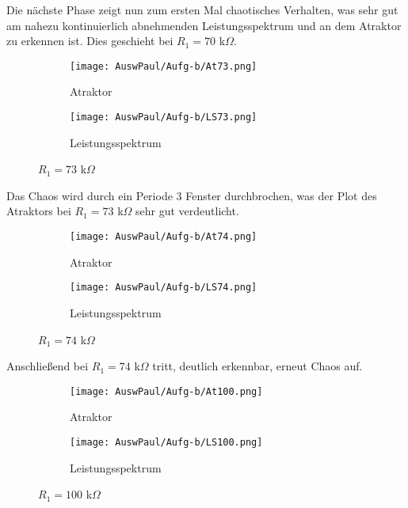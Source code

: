 Die nächste Phase zeigt nun zum ersten Mal chaotisches Verhalten, was sehr gut am nahezu kontinuierlich abnehmenden Leistungsspektrum und an dem Atraktor zu erkennen ist. Dies geschieht bei $R_1 = 70$ k$\Omega$.

\begin{figure}[h]
    \centering
    \begin{subfigure}[b]{0.45\textwidth}
        \centering
        \texttt{[image: AuswPaul/Aufg-b/At73.png]}
        \caption{Atraktor}
    \end{subfigure}
    \hfill
    \begin{subfigure}[b]{0.45\textwidth}
        \centering
        \texttt{[image: AuswPaul/Aufg-b/LS73.png]}
        \caption{Leistungsspektrum}
    \end{subfigure}
    \caption{$R_1 = 73$ k$\Omega$}
\end{figure}

Das Chaos wird durch ein Periode 3 Fenster durchbrochen, was der Plot des Atraktors bei $R_1 = 73$ k$\Omega$ sehr gut verdeutlicht.

\begin{figure}[h]
    \centering
    \begin{subfigure}[b]{0.45\textwidth}
        \centering
        \texttt{[image: AuswPaul/Aufg-b/At74.png]}
        \caption{Atraktor}
    \end{subfigure}
    \hfill
    \begin{subfigure}[b]{0.45\textwidth}
        \centering
        \texttt{[image: AuswPaul/Aufg-b/LS74.png]}
        \caption{Leistungsspektrum}
    \end{subfigure}
    \caption{$R_1 = 74$ k$\Omega$}
\end{figure}

\newpage
Anschließend bei $R_1 = 74$ k$\Omega$ tritt, deutlich erkennbar, erneut Chaos auf.

\begin{figure}[h]
    \centering
    \begin{subfigure}[b]{0.45\textwidth}
        \centering
        \texttt{[image: AuswPaul/Aufg-b/At100.png]}
        \caption{Atraktor}
    \end{subfigure}
    \hfill
    \begin{subfigure}[b]{0.45\textwidth}
        \centering
        \texttt{[image: AuswPaul/Aufg-b/LS100.png]}
        \caption{Leistungsspektrum}
    \end{subfigure}
    \caption{$R_1 = 100$ k$\Omega$}
\end{figure}

